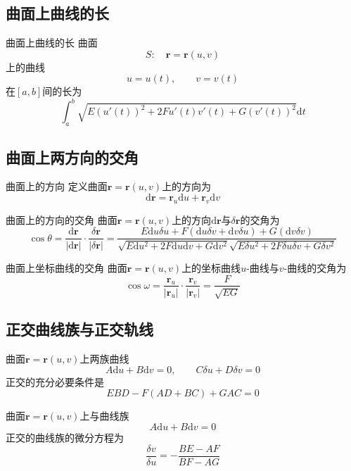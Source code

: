 \documentclass[lang = cn, scheme = chinese, thmcnt = section]{elegantbook}
\newcommand{\bs}{\boldsymbol}          %
\newcommand{\dd}{\mathrm{d}}           %
\begin{document}
\subsection{曲面上曲线的长}

\begin{theorem}{曲面上曲线的长}
	曲面
	$$
	S:\quad \bs{r}=\bs{r}(u,v)
	$$
	上的曲线
	$$
	u=u(t),\qquad 
	v=v(t)
	$$
	在$[a,b]$间的长为%
	$$
	\int_{a}^{b}\sqrt{E(u'(t))^2+2Fu'(t)v'(t)+G(v'(t))^2}\dd t
	$$
\end{theorem}

\subsection{曲面上两方向的交角}

\begin{definition}{曲面上的方向}
	定义曲面$\bs{r}=\bs{r}(u,v)$上的方向为%
	$$
	\dd \bs{r}=\bs{r}_u\dd u+\bs{r}_v\dd v
	$$
\end{definition}

\begin{theorem}{曲面上的方向的交角}
	曲面$\bs{r}=\bs{r}(u,v)$上的方向$\dd \bs{r}$与$\delta\bs{r}$的交角为%
	$$
	\cos\theta
	=\frac{\dd\bs{r}}{|\dd\bs{r}|}\cdot\frac{\delta\bs{r}}{|\delta\bs{r}|}
	=\frac{E\dd u\delta u+F(\dd u\delta v+\dd v\delta u)+G(\dd v\delta v)}{\sqrt{E\dd u^2+2F\dd u\dd v+G\dd v^2}\sqrt{E\delta u^2+2F\delta u\delta v+G\delta v^2}}
	$$
\end{theorem}

\begin{corollary}{曲面上坐标曲线的交角}
	曲面$\bs{r}=\bs{r}(u,v)$上的坐标曲线$u$-曲线与$v$-曲线的交角为%
	$$
	\cos\omega=\frac{\bs{r}_u}{|\bs{r}_u|}\cdot\frac{\bs{r}_v}{|\bs{r}_v|}=\frac{F}{\sqrt{EG}}
	$$
\end{corollary}

\subsection{正交曲线族与正交轨线}

\begin{theorem}
	曲面$\bs{r}=\bs{r}(u,v)$上两族曲线%
	$$
	A\dd u+B\dd v=0,\qquad 
	C\delta u+D\delta v=0
	$$
	正交的充分必要条件是
	$$
	EBD-F(AD+BC)+GAC=0
	$$
\end{theorem}

\begin{theorem}
	曲面$\bs{r}=\bs{r}(u,v)$上与曲线族%
	$$
	A\dd u+B\dd v=0
	$$
	正交的曲线族的微分方程为%
	$$
	\frac{\delta v}{\delta u}
	=-\frac{BE-AF}{BF-AG}
	$$
\end{theorem}
\end{document}
